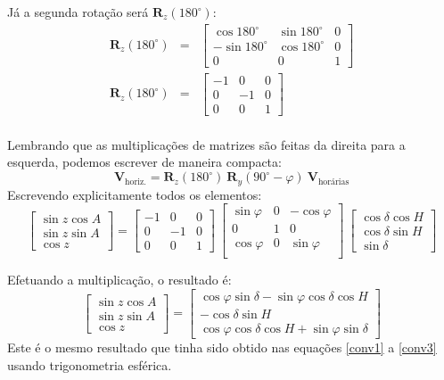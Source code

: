 Já a segunda rotação será $\textbf{R}_z(180^{\circ})$:
%
\begin{eqnarray}
\textbf{R}_z(180^{\circ}) &=& 
\begin{bmatrix}
\cos 180^{\circ} & \sin 180^{\circ} & 0 \\
-\sin 180^{\circ} & \cos 180^{\circ} & 0 \\ 
0 & 0 & 1
\end{bmatrix} \\
\textbf{R}_z(180^{\circ}) &=& 
\begin{bmatrix}
-1 & 0 & 0 \\
0 & -1 & 0 \\ 
0 & 0 & 1
\end{bmatrix} \\
\end{eqnarray}

Lembrando que as multiplicações de matrizes são feitas da direita para a esquerda, podemos escrever de maneira compacta:
%
\begin{equation}
\textbf{V}_\text{horiz.} = \textbf{R}_z(180^{\circ}) ~ \textbf{R}_y(90^{\circ} - \varphi) ~ \textbf{V}_\text{hor\'arias}
\end{equation}
%
Escrevendo explicitamente todos os elementos:
%
\begin{equation}
\begin{bmatrix}
\sin z \cos A \\
\sin z \sin A \\
\cos z
\end{bmatrix} = 
\begin{bmatrix}
-1 & 0 & 0 \\
0 & -1 & 0 \\ 
0 & 0 & 1
\end{bmatrix} ~
\begin{bmatrix}
\sin \varphi & 0 & -\cos \varphi \\
0 & 1 & 0 \\
\cos \varphi & 0 & \sin \varphi \\ 
\end{bmatrix} ~
\begin{bmatrix}
\cos \delta \cos H \\
\cos \delta \sin H \\
\sin \delta
\end{bmatrix}
\end{equation}

Efetuando a multiplicação, o resultado é:
%
\begin{equation}
\begin{bmatrix}
\sin z \cos A \\
\sin z \sin A \\
\cos z
\end{bmatrix} = 
\begin{bmatrix}
\cos \varphi \sin \delta - \sin \varphi \cos \delta \cos H \\
-\cos \delta \sin H \\
\cos \varphi \cos \delta \cos H + \sin \varphi \sin \delta
\end{bmatrix}
\end{equation}
%
Este é o mesmo resultado que tinha sido obtido nas equações \ref{conv1} a \ref{conv3} usando trigonometria esférica.

